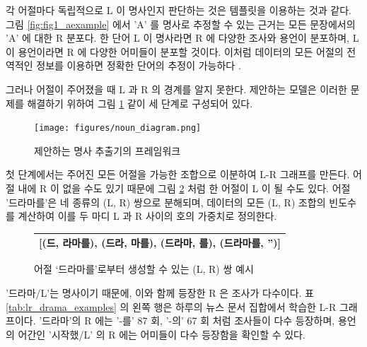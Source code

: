 \documentclass[11pt]{article}
\begin{document}
각 어절마다 독립적으로 L 이 명사인지 판단하는 것은 템플릿을 이용하는 것과 같다.
그림 \ref{fig:fig1_aexample} 에서 'A' 를 명사로 추정할 수 있는 근거는 모든 문장에서의 'A' 에 대한 R 분포다.
한 단어 L 이 명사라면 R 에 다양한 조사와 용언이 분포하며, L 이 용언이라면 R 에 다양한 어미들이 분포할 것이다.
이처럼 데이터의 모든 어절의 전역적인 정보를 이용하면 정확한 단어의 추정이 가능하다 \citep{zhao2007incorporating}.

그러나 어절이 주어졌을 때 L 과 R 의 경계를 알지 못한다.
제안하는 모델은 이러한 문제를 해결하기 위하여 그림 \ref{fig:noun_diagram} 같이 세 단계로 구성되어 있다.

\begin{figure}[ht]
\centering
\texttt{[image: figures/noun\_diagram.png]}
\label{fig:noun_diagram}
\caption{제안하는 명사 추출기의 프레임워크}
\end{figure}

첫 단계에서는 주어진 모든 어절을 가능한 조합으로 이분하여 L-R 그래프를 만든다.
어절 내에 R 이 없을 수도 있기 때문에 그림 \ref{fig:four_lrcandidates} 처럼 한 어절이 L 이 될 수도 있다.
어절 '드라마를'은 네 종류의 (L, R) 쌍으로 분해되며, 데이터의 모든 (L, R) 조합의 빈도수를 계산하여 이를 두 마디 L 과 R 사이의 호의 가중치로 정의한다.

\begin{figure}[ht]
\centering
\caption{어절 ‘드라마를’로부터 생성할 수 있는 (L, R) 쌍 예시}
\label{fig:four_lrcandidates}
\begin{tabular}{|c|}
\hline
{[}(드, 라마를), (드라, 마를), (드라마, 를), (드라마를, ''){]} \\ \hline
\end{tabular}%
\end{figure}

'드라마/L'는 명사이기 때문에, 이와 함께 등장한 R 은 조사가 다수이다.
표 \ref{tab:lr_drama_examples} 의 왼쪽 행은 하루의 뉴스 문서 집합에서 학습한 L-R 그래프이다.
'드라마'의 R 에는 '-를' 87 회, '-의' 67 회 처럼 조사들이 다수 등장하며, 용언의 어간인 '시작했/L' 의 R 에는 어미들이 다수 등장함을 확인할 수 있다.
\end{document}
